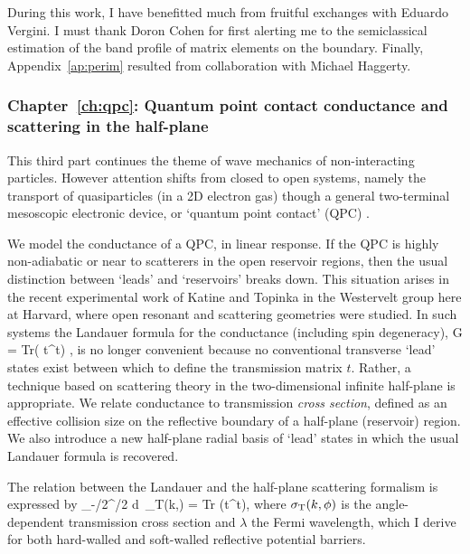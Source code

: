 During this work,
I have benefitted much from fruitful exchanges with Eduardo Vergini.
I must thank Doron Cohen for first alerting me to the
semiclassical estimation of the band profile of matrix
elements on the boundary.
Finally,
Appendix~\ref{ap:perim} resulted from collaboration with Michael Haggerty.



\subsubsection{Chapter~\ref{ch:qpc}: Quantum point contact conductance
and scattering in the half-plane}

This third part continues the theme of wave mechanics of non-interacting
particles.
However attention shifts from closed to open systems, namely
the transport
of quasiparticles (in a 2D electron gas) though a general two-terminal
mesoscopic electronic device, or `quantum point contact' (QPC)
\cite{been,dittrich}.

We model the conductance of a QPC, in linear response.
If the QPC is highly non-adiabatic or near to
scatterers in the open reservoir regions, then
the usual distinction between `leads' and `reservoirs' breaks down.
This situation arises in the recent experimental work of
Katine \cite{kati97} and Topinka \cite{topinka}
in the Westervelt group
here at Harvard, where open resonant and scattering geometries were studied.
In such systems the Landauer formula \cite{LB1,LB2,LB3,datta,dittrich}
for the conductance
(including spin degeneracy),
\be
\label{i_lb}
        G \; = \;  \mbox{Tr}( t^\dag t) ,
\ee
is no longer convenient because no conventional transverse `lead' states
exist between which to define the transmission matrix $t$.
Rather, a technique based on scattering theory
in the two-dimensional infinite half-plane is appropriate.
We relate conductance to transmission {\em cross section}, defined as an
effective collision size on the reflective boundary of a half-plane
(reservoir) region.
We also introduce a new half-plane radial basis of `lead' states
in which the usual Landauer formula is recovered.

The relation between the Landauer and the half-plane scattering formalism
is expressed by
\be
        \int_{-\pi/2}^{\pi/2} \!\! d\phi \, \sigma_{\rm T}(k,\phi) \; = \; 
        \lambda \mbox{Tr} (t^\dag t),
\ee
where $\sigma_{\rm T}(k,\phi)$ is the angle-dependent transmission cross section
and $\lambda$ the Fermi wavelength,
which I derive for both hard-walled and soft-walled reflective
potential barriers.

